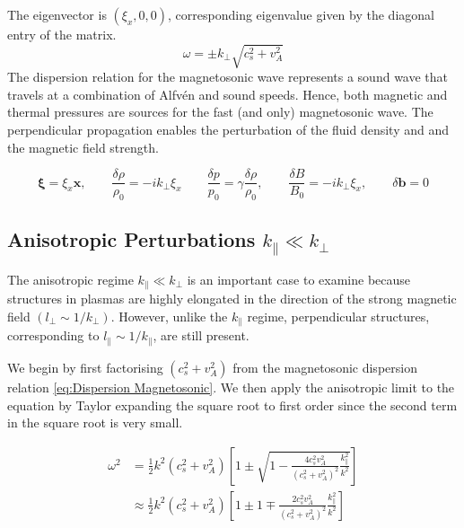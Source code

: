 The eigenvector is \((\xi_x,0,0 )\), corresponding eigenvalue given by the diagonal entry of the matrix.
\begin{equation}
    \omega =\pm k_{\perp}\sqrt{c_s^2 +v_A^2}
    \label{eq:Magento perp}
\end{equation}
The dispersion relation for the magnetosonic wave represents a sound wave that travels at a combination of Alfv\'en and sound speeds. Hence, both magnetic and thermal pressures are sources for the fast (and only) magnetosonic wave. The perpendicular propagation enables the perturbation of the fluid density and and the magnetic field strength. 

\begin{equation*}
    \boldsymbol{\xi}= \xi_{x} \hat{\boldsymbol{x}}, \qquad \frac{\delta\rho}{\rho_0}=-ik_{\perp}\xi_{x} \qquad \frac{\delta p}{p_0}=\gamma \frac{\delta\rho}{\rho_0}, \qquad \frac{\delta B}{B_0}=-ik_{\perp}\xi_x, \qquad \delta\boldsymbol{b}= 0
\end{equation*}

\subsection{Anisotropic Perturbations \(k_{\parallel} \ll k_{\perp}\)}
The anisotropic regime \(k_{\parallel} \ll k_{\perp}\) is an important case to examine because structures in plasmas are highly elongated in the direction of the strong magnetic field \((l_{\perp} \sim 1/k_{\perp})\). However, unlike the \(k_{\parallel}\) regime, perpendicular structures, corresponding to \(l_{\parallel} \sim 1/k_{\parallel}\), are still present.

We begin by first factorising \((c_s^2+v_A^2)\) from the magnetosonic dispersion relation \eqref{eq:Dispersion Magnetosonic}. We then apply the anisotropic limit to the equation by Taylor expanding the square root to first order since the second term in the square root is very small.

\begin{equation*}
    \begin{split}
    \omega^{2} &= \frac{1}{2} k^{2} \left( c_{s}^{2} + v_{A}^{2} \right)
    \left[ 1 \pm \sqrt{1 - \frac{4 c_{s}^{2} v_{A}^{2}}{\left( c_{s}^{2} + v_{A}^{2} \right)^{2}} \frac{k_{\parallel}^{2}}{k^{2}}} \right]\\
    &\approx \frac{1}{2} k^{2} \left( c_{s}^{2} + v_{A}^{2} \right)
    \left[ 1 \pm 1 \mp \frac{2 c_{s}^{2} v_{A}^{2}}{\left( c_{s}^{2} + v_{A}^{2} \right)^{2}} \frac{k_{\parallel}^{2}}{k^{2}} \right] 
    \end{split}
\end{equation*}

